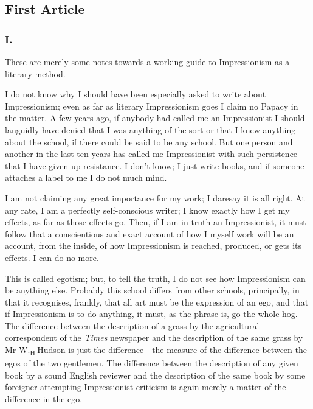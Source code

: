 \subsection{First Article}\label{first-article}

\subsubsection{I.}\label{i.}

These are merely some notes towards a working guide to Impressionism as
a literary method.

I do not know why I should have been especially asked to write about
Impressionism; even as far as literary Impressionism goes I claim no
Papacy in the matter. A few years ago, if anybody had called me an
Impressionist I should languidly have denied that I was anything of the
sort or that I knew anything about the school, if there could be said to
be any school. But one person and another in the last ten years has
called me Impressionist with such persistence that I have given up
resistance. I don't know; I just write books, and if someone attaches a
label to me I do not much mind.

I am not claiming any great importance for my work; I daresay it is all
right. At any rate, I am a perfectly self-conscious writer; I know
exactly how I get my effects, as far as those effects go. Then, if I am
in truth an Impressionist, it must follow that a conscientious and exact
account of how I myself work will be an account, from the inside, of how
Impressionism is reached, produced, or gets its effects. I can do no
more.

This is called egotism; but, to tell the truth, I do not see how
Impressionism can be anything else. Probably this school differs from
other schools, principally, in that it recognises, frankly, that all art
must be the expression of an ego, and that if Impressionism is to do
anything, it must, as the phrase is, go the whole hog. The difference
between the description of a grass by the agricultural correspondent of
the \emph{Times} newspaper and the description of the same grass by Mr
W.\textsubscript{H.}Hudson is just the difference---the measure of the
difference between the egos of the two gentlemen. The difference between
the description of any given book by a sound English reviewer and the
description of the same book by some foreigner attempting Impressionist
criticism is again merely a matter of the difference in the ego.

